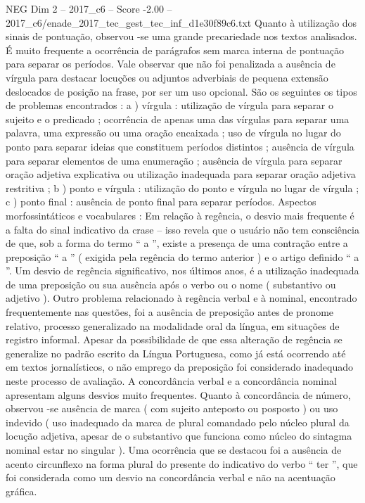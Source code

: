 \begin{textsample}{NEG Dim 2 – 2017\_c6 – Score -2.00 – 2017\_c6/enade\_2017\_tec\_gest\_tec\_inf\_d1e30f89c6.txt}
Quanto à utilização dos sinais de pontuação, observou -se uma grande precariedade nos textos analisados.
É muito frequente a ocorrência de parágrafos sem marca interna de pontuação para separar os períodos.
Vale observar que não foi penalizada a ausência de vírgula para destacar locuções ou adjuntos adverbiais de pequena extensão deslocados de posição na frase, por ser um uso opcional.
São os seguintes os tipos de problemas encontrados : a ) vírgula : utilização de vírgula para separar o sujeito e o predicado ; ocorrência de apenas uma das vírgulas para separar uma palavra, uma expressão ou uma oração encaixada ; uso de vírgula no lugar do ponto para separar ideias que constituem períodos distintos ; ausência de vírgula para separar elementos de uma enumeração ; ausência de vírgula para separar oração adjetiva explicativa ou utilização inadequada para separar oração adjetiva restritiva ; b ) ponto e vírgula : utilização do ponto e vírgula no lugar de vírgula ; c ) ponto final : ausência de ponto final para separar períodos.
Aspectos morfossintáticos e vocabulares : Em relação à regência, o desvio mais frequente é a falta do sinal indicativo da crase – isso revela que o usuário não tem consciência de que, sob a forma do termo “ a ”, existe a presença de uma contração entre a preposição “ a ” ( exigida pela regência do termo anterior ) e o artigo definido “ a ”.
Um desvio de regência significativo, nos últimos anos, é a utilização inadequada de uma preposição ou sua ausência após o verbo ou o nome ( substantivo ou adjetivo ).
Outro problema relacionado à regência verbal e à nominal, encontrado frequentemente nas questões, foi a ausência de preposição antes de pronome relativo, processo generalizado na modalidade oral da língua, em situações de registro informal.
Apesar da possibilidade de que essa alteração de regência se generalize no padrão escrito da Língua Portuguesa, como já está ocorrendo até em textos jornalísticos, o não emprego da preposição foi considerado inadequado neste processo de avaliação.
A concordância verbal e a concordância nominal apresentam alguns desvios muito frequentes.
Quanto à concordância de número, observou -se ausência de marca ( com sujeito anteposto ou posposto ) ou uso indevido ( uso inadequado da marca de plural comandado pelo núcleo plural da locução adjetiva, apesar de o substantivo que funciona como núcleo do sintagma nominal estar no singular ).
Uma ocorrência que se destacou foi a ausência de acento circunflexo na forma plural do presente do indicativo do verbo “ ter ”, que foi considerada como um desvio na concordância verbal e não na acentuação gráfica.

\end{textsample}
